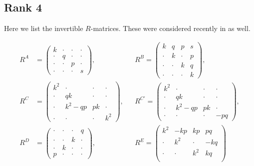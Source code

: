 \documentclass{article}
\begin{document}
\subsection{Rank 4} 

Here we list the invertible $R$-matrices. These were considered recently in \cite{Maity:2024vtr} as well.

\begin{align}
   R^{A}& = \begin{pmatrix}
        k&\cdot&\cdot&\cdot\\
        \cdot&q&\cdot&\cdot\\
        \cdot&\cdot&p&\cdot\\
        \cdot&\cdot&\cdot&s
    \end{pmatrix},
&&   R^B= \begin{pmatrix}
        k&q&p&s\\
        \cdot&k&\cdot&p\\
        \cdot&\cdot&k&q\\
        \cdot&\cdot&\cdot&k
    \end{pmatrix} ,\\
        R^C&=\begin{pmatrix}
        k^2&\cdot&\cdot&\cdot\\
        \cdot&q k&\cdot&\cdot\\
        \cdot&k^2-qp&p k&\cdot\\
        \cdot&\cdot&\cdot&k^2
    \end{pmatrix},
    &&   R^{C'}=\begin{pmatrix}
        k^2&\cdot&\cdot&\cdot\\
        \cdot&q k&\cdot&\cdot\\
        \cdot&k^2-qp&p k&\cdot\\
        \cdot&\cdot&\cdot&-pq
    \end{pmatrix}, \\
   R^D&=\begin{pmatrix}
        \cdot&\cdot&\cdot&q\\
        \cdot&\cdot&k&\cdot\\
        \cdot&k&\cdot&\cdot\\
        p&\cdot&\cdot&\cdot
    \end{pmatrix},
&&   R^E = \begin{pmatrix}
        k^2&-kp&kp&pq\\
        \cdot&k^2&\cdot&-kq\\
        \cdot&\cdot&k^2&kq\\

\end{pmatrix}
\end{align}
\end{document}
